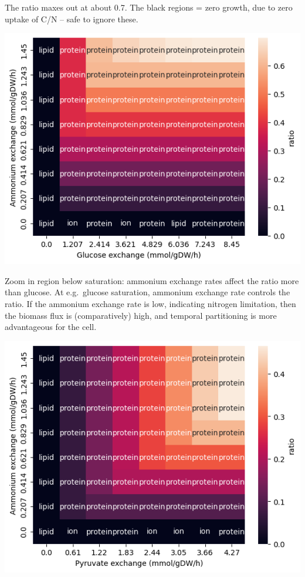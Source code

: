 The ratio maxes out at about 0.7.  The black regions = zero growth, due to zero uptake of C/N -- safe to ignore these.

\begin{center}
\includegraphics[width=.9\linewidth]{ecYeast8-ablation-heatmap-under_saturation_8x.png}
\end{center}

Zoom in region below saturation: ammonium exchange rates affect the ratio more than glucose.
At e.g.\ glucose saturation, ammonium exchange rate controls the ratio.
If the ammonium exchange rate is low, indicating nitrogen limitation, then the biomass flux is (comparatively) high, and temporal partitioning is more advantageous for the cell.

\begin{center}
\includegraphics[width=.9\linewidth]{ecYeast8-ablation-heatmap-pyruvate-under_saturation_8x.png}
\end{center}

